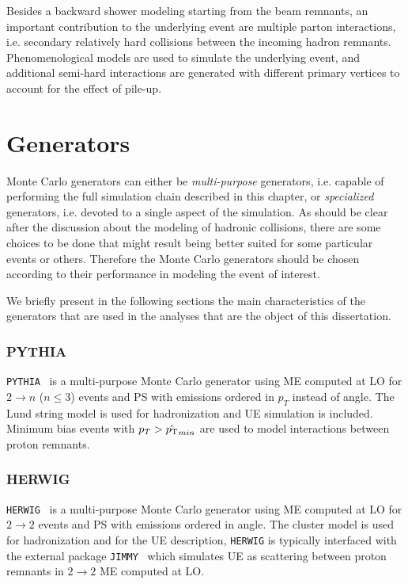 Besides a backward shower modeling starting from the beam remnants, an
important contribution to the underlying event are multiple parton interactions,
i.e. secondary relatively hard collisions between the incoming hadron remnants.
Phenomenological models are used to simulate the underlying event, and additional
semi-hard interactions are generated with different primary vertices to account
for the effect of pile-up.


\section{Generators}\label{sec:generators}

Monte Carlo generators can either be {\it multi-purpose} generators,
i.e. capable of performing the full simulation chain described in this chapter,
or {\it specialized} generators, i.e. devoted to a single aspect of the
simulation. As should be clear after the discussion about the modeling
of hadronic collisions, there are some choices to be done that might result
being better suited for some particular events or others. Therefore
the Monte Carlo generators should be chosen according to their performance
in modeling the event of interest.

We briefly present in the following sections the main characteristics of the generators
that are used in the analyses that are the object of this dissertation.


\subsubsection*{PYTHIA}

\texttt{PYTHIA}~\cite{PYTHIA} is a multi-purpose Monte Carlo generator
using ME computed at LO for $2 \to n$ ($n\leq 3$) events and PS with emissions
ordered in $p_T$ instead of angle. The Lund string model is used for hadronization
and UE simulation is included.
Minimum bias events with $p_T>\hat{\pt}_{min}$ are used to model interactions
between proton remnants.


\subsubsection*{HERWIG}

\texttt{HERWIG}~\cite{HERWIG} is a multi-purpose Monte Carlo generator
using ME computed at LO for $2 \to 2$ events and PS with emissions ordered in angle. 
The cluster model is used for hadronization and for the UE description, \texttt{HERWIG}
is typically interfaced with the external package \texttt{JIMMY}~\cite{jimmy} which
simulates UE as scattering between proton remnants in  $2 \to 2$ ME computed at LO.



